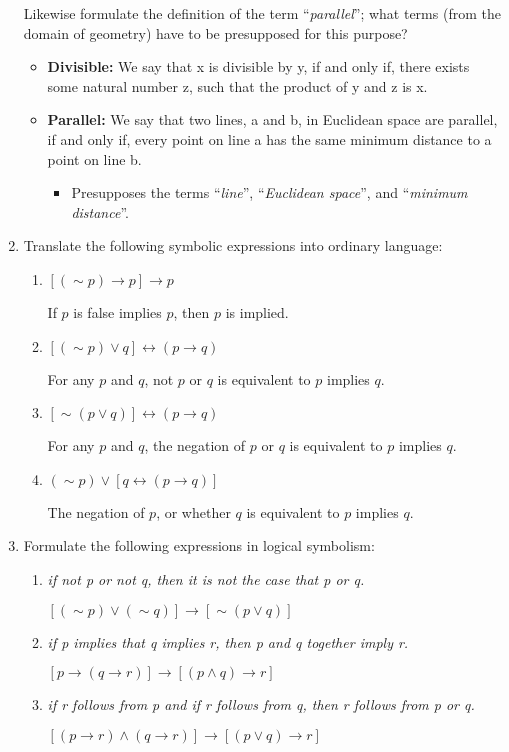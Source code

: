 \begin{enumerate}
  Likewise formulate the definition of the term ``\emph{parallel}'';
  what terms (from the domain of geometry) have to be presupposed for
  this purpose?
  \begin{itemize}
  \item \textbf{Divisible:} We say that x is divisible by y, if and
    only if, there exists some natural number z, such that the product
    of y and z is x.
  \item \textbf{Parallel:} We say that two lines, a and b, in
    Euclidean space are parallel, if and only if, every point on line
    a has the same minimum distance to a point on line b.
    \begin{itemize}
      \item Presupposes the terms ``\emph{line}'', ``\emph{Euclidean space}'', and
        ``\emph{minimum distance}''.
    \end{itemize}
  \end{itemize}
\item Translate the following symbolic expressions into ordinary language:
  \begin{enumerate}
  \item $[(\sim p) \rightarrow p ] \rightarrow p$

    If $p$ is false implies $p$, then $p$ is implied.
  \item $[(\sim p) \vee q ] \leftrightarrow (p \rightarrow q)$

    For any $p$ and $q$, not $p$ or $q$ is equivalent to $p$ implies $q$.
  \item $[\sim (p \vee q)] \leftrightarrow (p \rightarrow q)$

    For any $p$ and $q$, the negation of $p$ or $q$ is equivalent to $p$ implies $q$.
  \item $(\sim p) \vee [ q \leftrightarrow (p \rightarrow q)]$

    The negation of $p$, or whether $q$ is equivalent to $p$ implies $q$.
  \end{enumerate}
\item Formulate the following expressions in logical symbolism:
  \begin{enumerate}
    \item \emph{if not p or not q, then it is not the case that p or q.}
      
      $[(\sim p) \vee (\sim q)] \rightarrow [\sim (p \vee q)]$
    \item \emph{if p implies that q implies r, then p and q together imply r.}

      $[p \rightarrow (q \rightarrow r)] \rightarrow [(p \wedge q) \rightarrow r]$
    \item \emph{if r follows from p and if r follows from q, then r follows from p or q.}

      $[(p \rightarrow r) \wedge (q \rightarrow r)] \rightarrow [(p \vee q) \rightarrow r]$
  \end{enumerate}
\end{enumerate}
